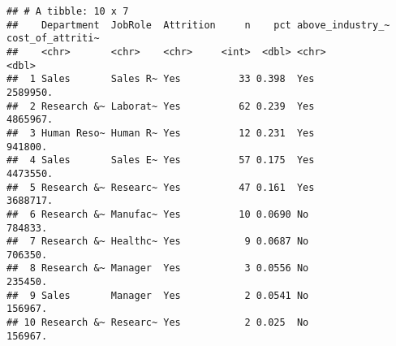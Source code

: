 \documentclass[
]{article}
\begin{document}
\begin{verbatim}
## # A tibble: 10 x 7
##    Department  JobRole  Attrition     n    pct above_industry_~ cost_of_attriti~
##    <chr>       <chr>    <chr>     <int>  <dbl> <chr>                       <dbl>
##  1 Sales       Sales R~ Yes          33 0.398  Yes                      2589950.
##  2 Research &~ Laborat~ Yes          62 0.239  Yes                      4865967.
##  3 Human Reso~ Human R~ Yes          12 0.231  Yes                       941800.
##  4 Sales       Sales E~ Yes          57 0.175  Yes                      4473550.
##  5 Research &~ Researc~ Yes          47 0.161  Yes                      3688717.
##  6 Research &~ Manufac~ Yes          10 0.0690 No                        784833.
##  7 Research &~ Healthc~ Yes           9 0.0687 No                        706350.
##  8 Research &~ Manager  Yes           3 0.0556 No                        235450.
##  9 Sales       Manager  Yes           2 0.0541 No                        156967.
## 10 Research &~ Researc~ Yes           2 0.025  No                        156967.
\end{verbatim}
\end{document}

